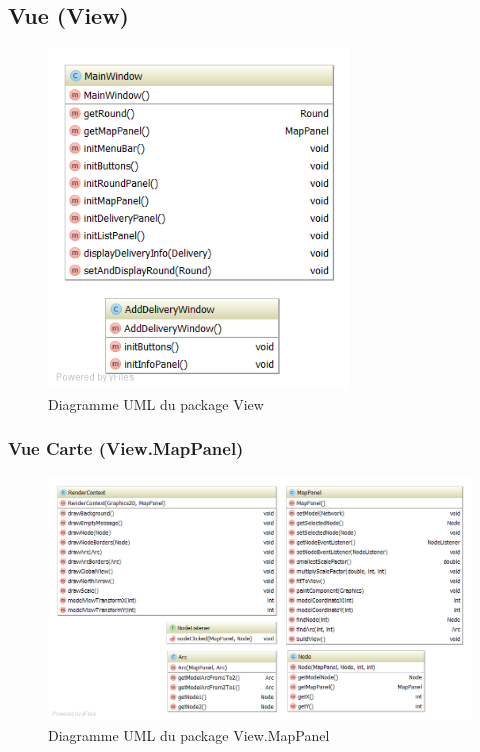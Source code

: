 \subsection{Vue (View)}

\begin{figure}[h]
    \centering
    \includegraphics[width=80mm]{../diagrams/classes_packages/classes_packages/view/view.png}
    \caption{Diagramme UML du package View}
    \label{diagram:uml_view}
\end{figure}
\pagebreak

\subsubsection{Vue Carte (View.MapPanel)}

\begin{figure}[h]
    \centering
    \includegraphics[width=160mm]{../diagrams/classes_packages/classes_packages/view/package_map.png}
    \caption{Diagramme UML du package View.MapPanel}
    \label{diagram:uml_view_map}
\end{figure}
\pagebreak

